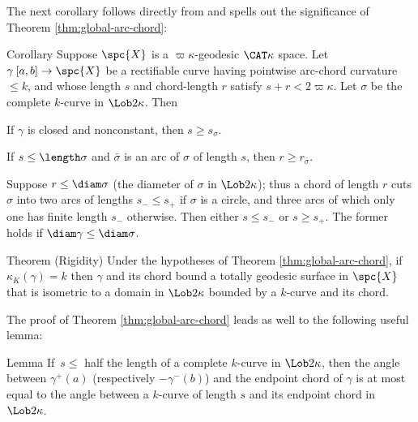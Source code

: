 The next corollary follows directly from  and spells out the significance of Theorem \ref{thm:global-arc-chord}:

\begin{thm}{Corollary}\label{cor:arc/chord-glob}    
Suppose $\spc{X}$ is a $\varpi\kappa$-geodesic $\CAT\kappa$ space.  
Let $\gamma\:[a,b]\to\spc{X}$ be a rectifiable curve having pointwise arc-chord curvature
$ \le k$, and whose length $s$ and chord-length $r$ satisfy $s+r<2\varpi\kappa$.    
Let $\sigma$ be the complete $k$-curve in $\Lob2\kappa$. 
Then 

\begin{subthm}{}  If $\gamma$ is
closed and nonconstant, then $s \ge s_\sigma$.\end{subthm}

\begin{subthm}{} 
 If $s \le\length \sigma$ and $\bar\sigma$ is an arc of $\sigma$ of length $s$, then $r \ge r_{\bar\sigma}$. 
\end{subthm}

\begin{subthm}{}  Suppose  $r \le\diam\sigma$ (the diameter of $\sigma$  in $\Lob2\kappa$); thus a chord of length $r$ 
cuts $\sigma$ into  two arcs of lengths  $s_-\le s_+$ if $\sigma$ is a circle, and three arcs of which only one has finite length $s_-$ otherwise.  
Then 
either $s\le s_-$ or $s\ge s_+$.
The former holds if $\diam\gamma \le \diam\sigma$.
\end{subthm}
\end{thm}

\begin{thm}{Theorem (Rigidity)}\label{thm:arc-chord-rigidity}
Under the hypotheses of Theorem \ref{thm:global-arc-chord}, if 
$\kappa_{K}(\gamma) = k$ then $\gamma$ and its chord bound a totally
geodesic surface in $\spc{X}$ that is isometric to a domain  in $\Lob2\kappa$
bounded by a $k$-curve and its chord.
\end{thm}

The proof of  Theorem \ref{thm:global-arc-chord} leads as well to the following useful lemma:

\begin{thm}{Lemma}\label{prop:base-angle}
If \,$s\le$ half the length of a complete $k$-curve in $\Lob2{\kappa}$, then  
the angle between $\gamma^+(a)$ (respectively $-\gamma^-(b)$)  and the endpoint chord of $\gamma$ is at most equal to the angle between a $k$-curve of length $s$ and  its endpoint chord in $\Lob2{\kappa}$.
\end{thm}

